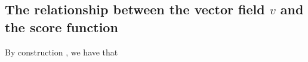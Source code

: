 \subsection{The relationship between the vector field $v$ and the score function} \label{subsec:v_score}
    By construction \citep{lipman2023flow,albergo2023building,albergo2023stochastic}, we have that
